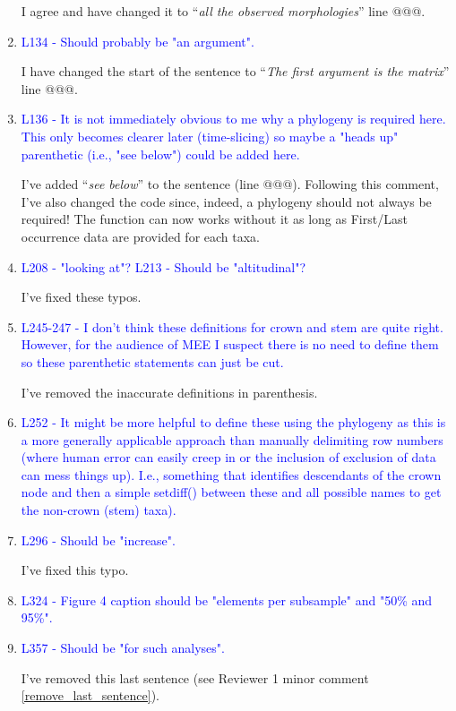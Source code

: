 \documentclass[12pt,letterpaper]{article}
\begin{document}
\begin{enumerate}
I agree and have changed it to ``\textit{all the observed morphologies}'' line @@@.

\item{\textcolor{blue}{L134 - Should probably be "an argument".}}

I have changed the start of the sentence to ``\textit{The first argument is the matrix}'' line @@@.

\item{\textcolor{blue}{L136 - It is not immediately obvious to me why a phylogeny is required here. This only becomes clearer later (time-slicing) so maybe a "heads up" parenthetic (i.e., "see below") could be added here.}}

I've added ``\textit{see below}'' to the sentence (line @@@).
Following this comment, I've also changed the code since, indeed, a phylogeny should not always be required!
The function can now works without it as long as First/Last occurrence data are provided for each taxa.

\item{\textcolor{blue}{L208 - "looking at"? L213 - Should be "altitudinal"?}}
\label{altitude}

I've fixed these typos.

\item{\textcolor{blue}{L245-247 - I don't think these definitions for crown and stem are quite right. However, for the audience of MEE I suspect there is no need to define them so these parenthetic statements can just be cut.}}

I've removed the inaccurate definitions in parenthesis.

\item{\textcolor{blue}{L252 - It might be more helpful to define these using the phylogeny as this is a more generally applicable approach than manually delimiting row numbers (where human error can easily creep in or the inclusion of exclusion of data can mess things up). I.e., something that identifies descendants of the crown node and then a simple setdiff() between these and all possible names to get the non-crown (stem) taxa).}}


\item{\textcolor{blue}{L296 - Should be "increase".}}

I've fixed this typo.

\item{\textcolor{blue}{L324 - Figure 4 caption should be "elements per subsample" and "50\% and 95\%".}}


\item{\textcolor{blue}{L357 - Should be "for such analyses".}}

I've removed this last sentence (see Reviewer 1 minor comment \ref{remove_last_sentence}).

\end{enumerate}
\end{document}
